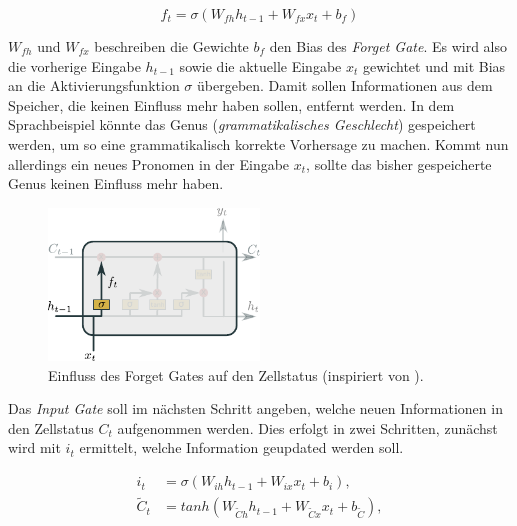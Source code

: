            \begin{equation}
                f_t = \sigma\left(W_{fh}h_{t-1} + W_{fx}x_t + b_f\right)
            \end{equation}

            $W_{fh}$ und $W_{fx}$ beschreiben die Gewichte $b_f$ den Bias des \textit{Forget Gate}.
            Es wird also die vorherige Eingabe $h_{t-1}$ sowie die aktuelle Eingabe $x_t$ gewichtet und mit Bias an die Aktivierungsfunktion $\sigma$ übergeben.
            Damit sollen Informationen aus dem Speicher, die keinen Einfluss mehr haben sollen, entfernt werden.
            In dem Sprachbeispiel könnte das Genus (\textit{grammatikalisches Geschlecht}) gespeichert werden, um so eine grammatikalisch korrekte Vorhersage zu machen.
            Kommt nun allerdings ein neues Pronomen in der Eingabe $x_t$, sollte das bisher gespeicherte Genus keinen Einfluss mehr haben.
            
                \begin{figure}[ht]
                    \centering
                    \includegraphics[width=0.5\textwidth]{images/Illustrationen/LSTM_FG}
                    \caption{Einfluss des Forget Gates auf den Zellstatus (inspiriert von \cite{OLAH2015}).}
                    \label{fig:LSTM_Forget}
                \end{figure}
                
            Das \textit{Input Gate} soll im nächsten Schritt angeben, welche neuen Informationen in den Zellstatus $C_t$ aufgenommen werden.
            Dies erfolgt in zwei Schritten, zunächst wird mit $i_t$ ermittelt, welche Information geupdated werden soll.

            \begin{equation}
                \begin{split}
                    i_t &= \sigma\left(W_{ih}h_{t-1} + W_{ix}x_t + b_i\right), \\
                    \tilde{C}_t &= tanh\left(W_{\tilde{C}h}h_{t-1} + W_{\tilde{C}x}x_t + b_{\tilde{C}}\right),\\
                \end{split}
            \end{equation}

